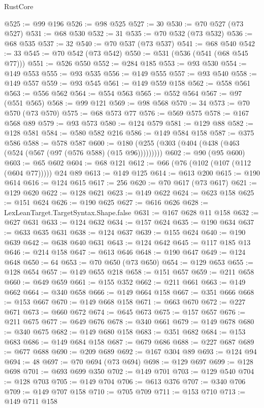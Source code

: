 \begin{lexlean}{RustCore}
\begin{coremodule}
@525 := @99 @196
@526 := @98 @525
@527 := 30
@530 := @70 @527 (@73 @527)
@531 := @68 @530
@532 := 31
@535 := @70 @532 (@73 @532)
@536 := @68 @535
@537 := 32
@540 := @70 @537 (@73 @537)
@541 := @68 @540
@542 := 33
@545 := @70 @542 (@73 @542)
@550 := @531 (@536 (@541 (@68 @545 @77)))
@551 := @526 @550
@552 := @284 @185
@553 := @93 @530
@554 := @149 @553
@555 := @93 @535
@556 := @149 @555
@557 := @93 @540
@558 := @149 @557
@559 := @93 @545
@561 := @149 @559 @158
@562 := @558 @561
@563 := @556 @562
@564 := @554 @563
@565 := @552 @564
@567 := @97 (@551 @565)
@568 := @99 @121
@569 := @98 @568
@570 := 34
@573 := @70 @570 (@73 @570)
@575 := @68 @573 @77
@576 := @569 @575
@578 := @167 @568 @89
@579 := @93 @573
@580 := @124 @579
@581 := @129 @88
@582 := @128 @581
@584 := @580 @582 @216
@586 := @149 @584 @158
@587 := @375 @586
@588 := @578 @587
@600 := @180 (@255 (@303 (@404 (@438 (@463 (@524 (@567 (@97 (@576 @588) (@15 @96)))))))))
@602 := @90 (@95 @600)
@603 := @65 @602
@604 := @68 @121
@612 := @66 (@76 (@102 (@107 (@112 (@604 @77))))) @24 @89
@613 := @149 @125
@614 := @613 @200
@615 := @190 @614
@616 := @124 @615
@617 := 256
@620 := @70 @617 (@73 @617)
@621 := @129 @620
@622 := @128 @621
@623 := @149 @622
@624 := @623 @158
@625 := @151 @624
@626 := @190 @625
@627 := @616 @626
@628 := LexLeanTarget.TargetSyntax.Shape.false
@631 := @167 @628 @11 @158
@632 := @627 @631
@633 := @124 @632
@634 := @157 @624
@635 := @190 @634
@637 := @633 @635 @631
@638 := @124 @637
@639 := @155 @624
@640 := @190 @639
@642 := @638 @640 @631
@643 := @124 @642
@645 := @117 @185 @13
@646 := @214 @158
@647 := @613 @646
@648 := @190 @647
@649 := @124 @648
@650 := 64
@653 := @70 @650 (@73 @650)
@654 := @129 @653
@655 := @128 @654
@657 := @149 @655 @218
@658 := @151 @657
@659 := @211 @658
@660 := @649 @659
@661 := @155 @352
@662 := @211 @661
@663 := @149 @662
@664 := @340 @658
@666 := @149 @664 @158
@667 := @351 @666
@668 := @153 @667
@670 := @149 @668 @158
@671 := @663 @670
@672 := @227 @671
@673 := @660 @672
@674 := @645 @673
@675 := @157 @657
@676 := @211 @675
@677 := @649 @676
@678 := @340 @661
@679 := @149 @678
@680 := @340 @675
@682 := @149 @680 @158
@683 := @351 @682
@684 := @153 @683
@686 := @149 @684 @158
@687 := @679 @686
@688 := @227 @687
@689 := @677 @688
@690 := @209 @689
@692 := @167 @304 @89
@693 := @124 @94
@694 := 48
@697 := @70 @694 (@73 @694)
@698 := @129 @697
@699 := @128 @698
@701 := @693 @699 @350
@702 := @149 @701
@703 := @129 @540
@704 := @128 @703
@705 := @149 @704
@706 := @613 @376
@707 := @340 @706
@709 := @149 @707 @158
@710 := @705 @709
@711 := @153 @710
@713 := @149 @711 @158

\end{coremodule}
\end{lexlean}
